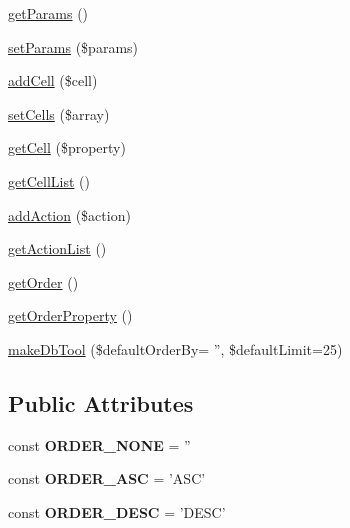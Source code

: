 \begin{DoxyCompactItemize}
\item 
\hyperlink{classTk_1_1Table_a8bc07d30ef6c3b3dd9cb237762a88a04}{get\+Params} ()
\item 
\hyperlink{classTk_1_1Table_ad192733f6037a1ff0329737f703fae46}{set\+Params} (\$params)
\item 
\hyperlink{classTk_1_1Table_a6f1a19ac73fbae29dc6db66cb74ee4ca}{add\+Cell} (\$cell)
\item 
\hyperlink{classTk_1_1Table_a2081482ceaf04dcfd9c3dc0babe3c4d8}{set\+Cells} (\$array)
\item 
\hyperlink{classTk_1_1Table_af86901df296e562cdc5c4540b284332b}{get\+Cell} (\$property)
\item 
\hyperlink{classTk_1_1Table_a5adbac62fe852512a9e9e55524467ffd}{get\+Cell\+List} ()
\item 
\hyperlink{classTk_1_1Table_a6b75409fa02b6bb44225e040f96d06ec}{add\+Action} (\$action)
\item 
\hyperlink{classTk_1_1Table_a5a49e3bb2de72bd794d936fe4363a809}{get\+Action\+List} ()
\item 
\hyperlink{classTk_1_1Table_a8a52a2fdcb4311745993e8b25bfc6fcf}{get\+Order} ()
\item 
\hyperlink{classTk_1_1Table_aa20f8942cb4796eb156e6ba981679a7f}{get\+Order\+Property} ()
\item 
\hyperlink{classTk_1_1Table_a735a5faecddead9d380fbf1a96dd21b9}{make\+Db\+Tool} (\$default\+Order\+By= '', \$default\+Limit=25)
\end{DoxyCompactItemize}
\subsection*{Public Attributes}
\begin{DoxyCompactItemize}
\item 
\hypertarget{classTk_1_1Table_aaee63233af171fb201922a5515e85770}{const {\bfseries O\+R\+D\+E\+R\+\_\+\+N\+O\+N\+E} = ''}\label{classTk_1_1Table_aaee63233af171fb201922a5515e85770}

\item 
\hypertarget{classTk_1_1Table_a4629bf6a6ff4a517d3a624cef6d80215}{const {\bfseries O\+R\+D\+E\+R\+\_\+\+A\+S\+C} = 'A\+S\+C'}\label{classTk_1_1Table_a4629bf6a6ff4a517d3a624cef6d80215}

\item 
\hypertarget{classTk_1_1Table_ae387329e4740a2fb4d2eb354db987436}{const {\bfseries O\+R\+D\+E\+R\+\_\+\+D\+E\+S\+C} = 'D\+E\+S\+C'}\label{classTk_1_1Table_ae387329e4740a2fb4d2eb354db987436}

\end{DoxyCompactItemize}
